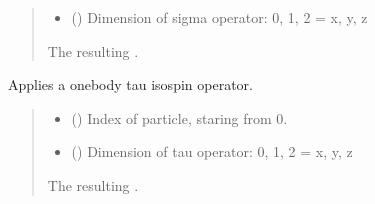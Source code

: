 \documentclass[letterpaper,10pt,english]{sphinxmanual}
\begin{document}
\begin{fulllineitems}
\begin{fulllineitems}
\begin{quote}
\begin{description}
\begin{itemize}
\item {} 
\sphinxAtStartPar
{} () \textendash{} Dimension of sigma operator: 0, 1, 2 = x, y, z

\end{itemize}

\sphinxAtStartPar
The resulting .

\sphinxAtStartPar
{\hyperref[\detokenize{spinbox:spinbox.core.HilbertOperator}]{}}

\end{description}\end{quote}

\end{fulllineitems}


\begin{fulllineitems}
\label{\detokenize{spinbox:spinbox.core.HilbertOperator.apply_tau}}
\pysigstartsignatures
{}
\pysigstopsignatures
\sphinxAtStartPar
Applies a one\sphinxhyphen{}body tau isospin operator.
\begin{quote}\begin{description}
\begin{itemize}
\item {} 
\sphinxAtStartPar
{} () \textendash{} Index of particle, staring from 0.

\item {} 
\sphinxAtStartPar
{} () \textendash{} Dimension of tau operator: 0, 1, 2 = x, y, z

\end{itemize}

\sphinxAtStartPar
The resulting .


\end{description}
\end{quote}
\end{fulllineitems}
\end{fulllineitems}
\end{document}
